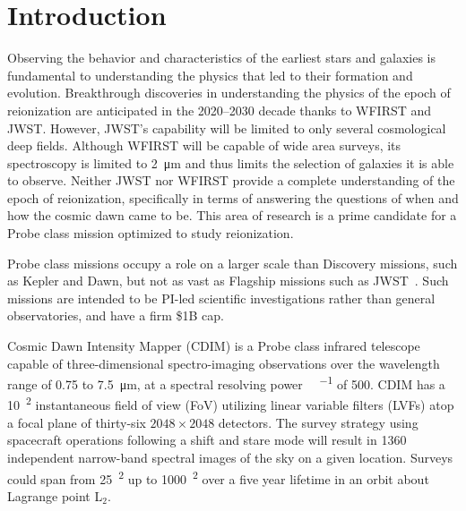 \documentclass{ws-jai}
\begin{document}
\section{Introduction}
\label{S:introduction}
Observing the behavior and characteristics of the earliest stars and galaxies is fundamental to understanding the physics that led to their formation and evolution.
Breakthrough discoveries in understanding the physics of the epoch of reionization are anticipated in the 2020--2030 decade thanks to WFIRST and JWST\@.
However, JWST's capability will be limited to only several cosmological deep fields.
Although WFIRST will be capable of wide area surveys, its spectroscopy is limited to \SI{2}{\micro\meter} and thus limits the selection of galaxies it is able to observe.
Neither JWST nor WFIRST provide a complete understanding of the epoch of reionization, specifically in terms of answering the questions of when and how the cosmic dawn came to be.
This area of research is a prime candidate for a Probe class mission optimized to study reionization.


Probe class missions occupy a role on a larger scale than Discovery missions, such as Kepler and Dawn, but not as vast as Flagship missions such as JWST~\cite{probeclasswp}.
Such missions are intended to be PI-led scientific investigations rather than general observatories, and have a firm \$1B cap.

Cosmic Dawn Intensity Mapper (CDIM) is a Probe class infrared telescope capable of three-dimensional spectro-imaging observations over the wavelength range of 0.75 to \SI{7.5}{\micro\meter}, at a spectral resolving power \si{\Delta\lambda\per\lambda} of 500.
CDIM has a \SI{10}{\deg\squared} instantaneous field of view (FoV) utilizing linear variable filters (LVFs) atop a focal plane of thirty-six $2048\times2048$ detectors.
The survey strategy using spacecraft operations following a shift and stare mode will result in 1360 independent narrow-band spectral images of the sky on a given location.
Surveys could span from \SI{25}{\deg\squared} up to \SI{1000}{\deg\squared} over a five year lifetime in an orbit about Lagrange point L$_{2}$\@.
\end{document}
